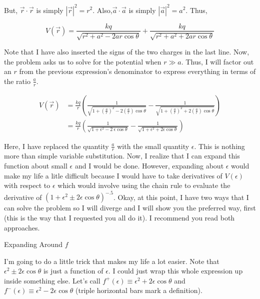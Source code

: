 \begin{homeworkProblem}[Quiz 4]
    But, $\vec{r}\cdot\vec{r}$ is simply $|\vec{r}|^2 = r^2$.
    Also,$\vec{a}\cdot\vec{a}$ is simply $|\vec{a}|^2 = a^2$. Thus,

    \[
    V(\vec{r}) = \frac{k q}{\sqrt{r^2+a^2-2ar\cos\theta}} + \frac{k
    q}{\sqrt{r^2+a^2+2ar\cos\theta}}
    \]
   
    Note that I have also inserted the signs of the two charges in the
    last line. Now, the problem asks us to solve for the potential when
    $r \gg a$. Thus, I will factor out an $r$ from the previous
    expression's denominator to express everything in terms of the
    ratio $\frac{a}{r}$.

    \begin{align}
        \label{}
        V(\vec{r}) &=  \frac{k q}{r} \left( 
        \frac{1}{\sqrt{1+\left( \frac{a}{r} \right)^2-2\left(
        \frac{a}{r} \right)\cos\theta}}
        -\frac{1}{\sqrt{1+\left( \frac{a}{r} \right)^2+2\left(
        \frac{a}{r} \right)\cos\theta}}
        \right) \nonumber \\
        &= \frac{k q}{r} 
        \left(
        \frac{1}{\sqrt{1+\epsilon^2-2\ \epsilon \cos\theta}} -
        \frac{1}{\sqrt{1+ \epsilon^2+2 \epsilon \cos\theta}}
        \right) \nonumber
    \end{align}

    Here, I have replaced the quantity $\frac{a}{r}$ with the small
    quantity $\epsilon$. This is nothing more than simple variable
    substitution. Now, I realize that I can expand this function about
    small $\epsilon$ and I would be done. However, expanding about
    $\epsilon$ would make my life a litle difficult because I would have
    to take derivatives of $V(\epsilon)$ with respect to $\epsilon$ which
    would involve using the chain rule to evaluate the derivative of
    $(1+\epsilon^2\pm2\epsilon\cos\theta)^{-.5}$. Okay, at this point, I
    have two ways that I can solve the problem so I will diverge and I
    will show you the preferred way, first (this is the way that I
    requested you all do it). I recommend you read both approaches.

    \begin{homeworkSection}{Expanding Around $f$}

    I'm going to do a little trick that makes my life a lot easier. Note
    that $\epsilon^2 \pm 2\epsilon\cos\theta$ is just a function of
    $\epsilon$. I could just wrap this whole expression up inside
    something else. Let's call $f^+(\epsilon) \equiv \epsilon^2 + 2
    \epsilon\cos\theta$ and $f^-(\epsilon) \equiv
    \epsilon^2-2\epsilon\cos\theta$ (triple horizontal bars mark a
    definition).
    

\end{homeworkSection}
\end{homeworkProblem}
